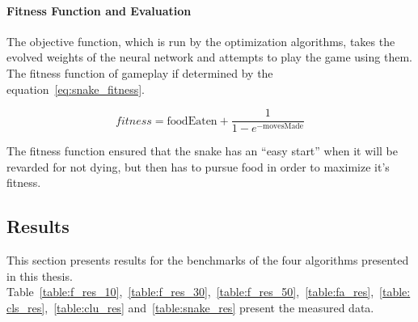 \paragraph{Fitness Function and Evaluation}

The objective function, which is run by the optimization algorithms, takes the evolved weights of the neural network and attempts to play the game using them. The fitness function of gameplay if determined by the equation~\ref{eq:snake_fitness}.

\begin{equation} \label{eq:snake_fitness}
  fitness = \text{foodEaten} + \frac{1}{1-e^{-\text{movesMade}}}
\end{equation}

The fitness function ensured that the snake has an ``easy start'' when it will be revarded for not dying, but then has to pursue food in order to maximize it's fitness.

\subsection{Results}

This section presents results for the benchmarks of the four algorithms presented in this thesis. Table~\ref{table:f_res_10},~\ref{table:f_res_30},~\ref{table:f_res_50},~\ref{table:fa_res},~\ref{table:cls_res},~\ref{table:clu_res} and~\ref{table:snake_res} present the measured data.

